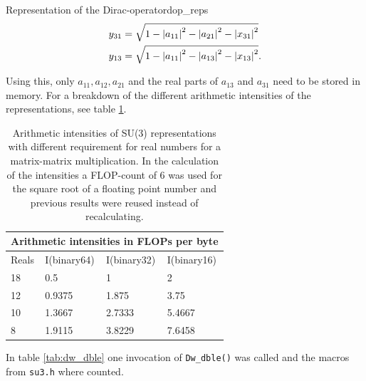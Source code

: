 \documentclass{article}
\theoremstyle{plain} %
\theoremstyle{convention} %
\theoremstyle{remark} %
\def\code#1{\texttt{#1}}
\numberwithin{equation}{section}
\begin{document}
\begin{proposal}{Representation of the Dirac-operator}{dop_reps}
\begin{align}
  y_{31} &= \sqrt{1 - \abs{a_{11}}^2 - \abs{a_{21}}^2 - \abs{x_{31}}^2} \\
  y_{13} &= \sqrt{1 - \abs{a_{11}}^2 - \abs{a_{13}}^2 - \abs{x_{13}}^2}.
\end{align}

Using this, only $a_{11}, a_{12}, a_{21}$ and the real parts of $a_{13}$ and $a_{31}$ need to be stored in memory. For a breakdown of the different arithmetic intensities of the representations, see table \ref{tab:ai_su3}.

\begin{table}[H]
\centering
    \begin{tabular}{ |p{1.2cm}|p{2cm}|p{2cm}|p{2cm}|  }
        \hline
        \multicolumn{4}{|c|}{Arithmetic intensities in FLOPs per byte} \\
        \hline
        Reals & I(binary64) & I(binary32) & I(binary16) \\
        \hline
        18  & 0.5    & 1       & 2      \\
        12  & 0.9375 & 1.875   & 3.75   \\
        10  & 1.3667 & 2.7333  & 5.4667 \\
        8   & 1.9115 & 3.8229  & 7.6458 \\
        \hline
    \end{tabular}
    \caption{Arithmetic intensities of SU(3) representations with different requirement for real numbers for a matrix-matrix multiplication. In the calculation of the intensities a FLOP-count of \num{6} was used for the square root of a floating point number and previous results were reused instead of recalculating.}
    \label{tab:ai_su3}
\end{table}
    
In table \ref{tab:dw_dble} one invocation of \code{Dw\_dble()} was called and the macros from \code{su3.h} where counted.


\end{proposal}
\end{document}
